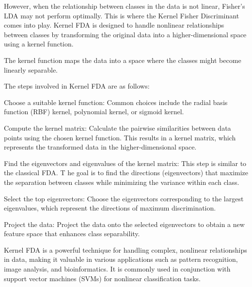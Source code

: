 However, when the relationship between classes in the data is not linear, Fisher's LDA may not perform optimally. 
This is where the Kernel Fisher Discriminant comes into play. Kernel FDA is designed to handle nonlinear relationships 
between classes by transforming the original data into a higher-dimensional space using a kernel function. 

The kernel function maps the data into a space where the classes might become linearly separable.

The steps involved in Kernel FDA are as follows:

Choose a suitable kernel function: Common choices include the radial basis function (RBF) kernel, polynomial kernel, 
or sigmoid kernel.

Compute the kernel matrix: Calculate the pairwise similarities between data points using the chosen kernel function. 
This results in a kernel matrix, which represents the transformed data in the higher-dimensional space.

Find the eigenvectors and eigenvalues of the kernel matrix: This step is similar to the classical FDA. T
he goal is to find the directions (eigenvectors) that maximize the separation between classes while minimizing 
the variance within each class.

Select the top eigenvectors: Choose the eigenvectors corresponding to the largest eigenvalues, 
which represent the directions of maximum discrimination.

Project the data: Project the data onto the selected eigenvectors to obtain a new feature space that enhances class separability.

Kernel FDA is a powerful technique for handling complex, nonlinear relationships in data, making it valuable in various 
applications such as pattern recognition, image analysis, and bioinformatics. It is commonly used in conjunction with support 
vector machines (SVMs) for nonlinear classification tasks.




